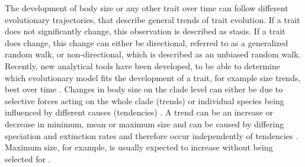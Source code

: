 The development of body size or any other trait over time can follow different evolutionary trajectories, that describe general trends of trait evolution. If a trait does not significantly change, this observation is described as stasis. If a trait does change, this change can either be directional, referred to as a generalized random walk, or non-directional, which is described as an unbiased random walk. Recently, new analytical tools have been developed, to be able to determine which evolutionary model fits the development of a trait, for example size trends, best over time \citep{Hunt2006,Hunt2015}.
Changes in body size on the clade level can either be due to selective forces acting on the whole clade (trends) or individual species being influenced by different causes (tendencies) \citep{Hunt2006}. A trend can be an increase or decrease in minimum, mean or maximum size and can be caused by differing speciation and extinction rates and therefore occur independently of tendencies \citep{Smith2016}. Maximum size, for example, is usually expected to increase without being selected for \citep{Smith2016}.



